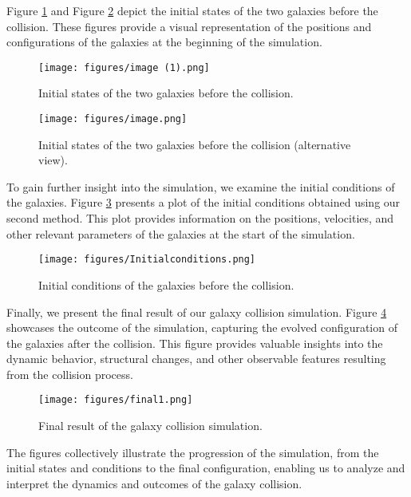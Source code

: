 \documentclass[reprint, amsmath, amssymb, aps]{revtex4-2}
\begin{document}
Figure \ref{fig:initial1} and Figure \ref{fig:initial2} depict the initial states of the two galaxies before the collision. These figures provide a visual representation of the positions and configurations of the galaxies at the beginning of the simulation.

\begin{figure}[htb]
\centering
\texttt{[image: figures/image (1).png]}
\caption{Initial states of the two galaxies before the collision.}
\label{fig:initial1}
\end{figure}

\begin{figure}[htb]
\centering
\texttt{[image: figures/image.png]}
\caption{Initial states of the two galaxies before the collision (alternative view).}
\label{fig:initial2}
\end{figure}

To gain further insight into the simulation, we examine the initial conditions of the galaxies. Figure \ref{fig:init_conditions} presents a plot of the initial conditions obtained using our second method. This plot provides information on the positions, velocities, and other relevant parameters of the galaxies at the start of the simulation.

\begin{figure}[htb]
\centering
\texttt{[image: figures/Initialconditions.png]}
\caption{Initial conditions of the galaxies before the collision.}
\label{fig:init_conditions}
\end{figure}

Finally, we present the final result of our galaxy collision simulation. Figure \ref{fig:final_result} showcases the outcome of the simulation, capturing the evolved configuration of the galaxies after the collision. This figure provides valuable insights into the dynamic behavior, structural changes, and other observable features resulting from the collision process.

\begin{figure}[htb]
\centering
\texttt{[image: figures/final1.png]}
\caption{Final result of the galaxy collision simulation.}
\label{fig:final_result}
\end{figure}

The figures collectively illustrate the progression of the simulation, from the initial states and conditions to the final configuration, enabling us to analyze and interpret the dynamics and outcomes of the galaxy collision.
\end{document}
